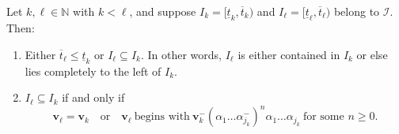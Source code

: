 \documentclass[10pt,a4paper]{amsart}
\newcommand{\II}{\mathcal{I}}
\newcommand{\N}{\ensuremath{\mathbb{N}}}
\newcommand{\al}{\alpha}
\renewcommand{\v}{\mathbf{v}}
\begin{document}
\begin{proposition} \label{prop:non-transitivity-intervals}
Let $k,\ell\in\N$ with $k<\ell$, and suppose $I_k=[\underline{t}_k,\overline{t}_k)$ and $I_\ell=[\underline{t}_\ell,\overline{t}_\ell)$ belong to $\II$. Then:
\begin{enumerate}[{\rm(i)}]
\item Either $\overline{t}_{\ell}\leq\underline{t}_k$ or $I_{\ell}\subseteq I_k$. In other words, $I_\ell$ is either contained in $I_k$ or else lies completely to the left of $I_k$.
\item $I_{\ell}\subseteq I_k$ if and only if
\begin{equation} \label{eq:containment-condition}
\v_{\ell}=\v_k\quad\mbox{or}\quad \v_{\ell}\ \mbox{begins with}\ \v_k^-(\al_1\dots\al_{j_k}^-)^n\al_1\dots\al_{j_k}\ \mbox{for some $n\geq 0$}.
\end{equation}
\end{enumerate}
\end{proposition}
\end{document}
